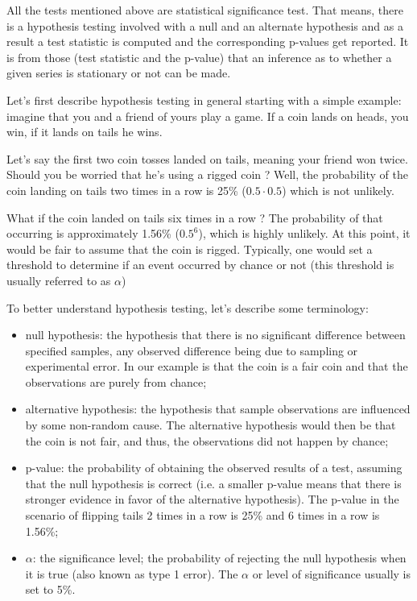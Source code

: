 All the tests mentioned above are statistical significance test. That means, there is a hypothesis testing involved with a null and an alternate hypothesis and as a result a test statistic is computed and the corresponding p-values get reported. It is from those (test statistic and the p-value) that an inference as to whether a given series is stationary or not can be made.

Let's first describe hypothesis testing in general starting with a simple example: imagine that you and a friend of yours play
a game. If a coin lands on heads, you win, if it lands on tails he wins.

Let's say the first two coin tosses landed on tails, meaning your friend won twice. Should you be worried that he's using a rigged coin ? Well, the probability of the coin landing on tails two times in a row is 25\% ($0.5\cdot 0.5$) which is not unlikely. 

What if the coin landed on tails six times in a row ? The probability of that occurring is approximately 1.56\% (\(0.5^6\)), which is highly unlikely. At this point, it would be fair to assume that the coin is rigged. Typically, one would set a threshold to determine if an event occurred by chance or not (this threshold is usually referred to as \(\alpha\))

To better understand hypothesis testing, let's describe some terminology:

\begin{itemize}
\tightlist
\item
  null hypothesis: the hypothesis that there is no significant difference between specified samples, any observed difference being   due to sampling or experimental error. In our example is that the coin is a fair coin and that the observations are purely from chance; 
\item
  alternative hypothesis: the hypothesis that sample observations are influenced by some non-random cause. The alternative hypothesis would then be that the coin is not fair, and thus, the observations did not happen by chance;
\item
  p-value: the probability of obtaining the observed results of a test, assuming that the null hypothesis is correct (i.e. a smaller p-value means that there is stronger evidence in favor of the alternative hypothesis). The p-value in the scenario of flipping tails 2 times in a row is 25\% and 6 times in a row is 1.56\%;
\item
  \(\alpha\): the significance level; the probability of rejecting the null hypothesis when it is true (also known as type 1 error). The \(\alpha\) or level of significance usually is set to 5\%.
\end{itemize}

